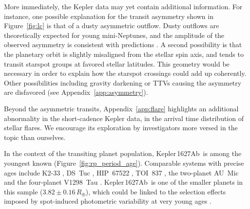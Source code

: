 \documentclass[12pt,modern,twocolumn,tighten]{aastex63}
\newcommand{\pn}{Kepler\,1627Ab} %
\begin{document}
More immediately, the Kepler data may yet contain additional
information.  For instance, one possible explanation for the transit
asymmetry shown in Figure~\ref{fig:lc} is that of a dusty asymmetric
outflow.  
Dusty outflows are theoretically
expected for young mini-Neptunes, and the amplitude of the observed
asymmetry is consistent with predictions \citep{wang_dai_2019}.
A second possibility is that the planetary orbit is slightly
misaligned from the stellar spin axis, and tends to transit starspot
groups at favored stellar latitudes.  
This geometry would be necessary in order to
explain how the starspot crossings could add up coherently.
Other possibilities including
gravity darkening or TTVs causing the asymmetry are disfavored (see
Appendix~\ref{app:asymmetry}).  

Beyond the asymmetric transits, Appendix~\ref{app:flare}
highlights an additional abnormality in the short-cadence Kepler data, in the
arrival time distribution of stellar flares.  We encourage its
exploration by investigators more versed in the topic than ourselves.

In the context of the transiting planet population, \pn\ is among the
youngest known (Figure~\ref{fig:rp_period_age}).  Comparable systems
with precise ages include K2-33
\citep{Mann_K2_33b_2016,David_et_al_2017}, DS~Tuc
\citep{benatti_possibly_2019,newton_tess_2019}, HIP~67522
\citep{rizzuto_tess_2020}, TOI~837 \citep{bouma_cluster_2020}, the
two-planet AU~Mic \citep{plavchan_planet_2020,martioli_aumicbc_2021}
and the four-planet V1298~Tau \citep{david_four_2019}.  \pn\ is one of
the smaller planets in this sample ($3.82\pm0.16\,R_\oplus$), which
could be linked to the selection effects imposed by spot-induced
photometric variability at very young ages \citep[{\it
e.g.},][]{zhou_2021_tois}. 
\end{document}

